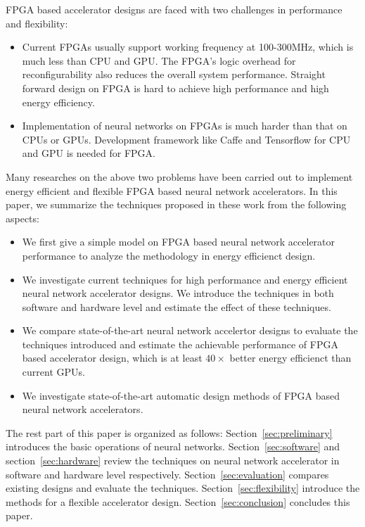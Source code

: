 FPGA based accelerator designs are faced with two challenges in performance and flexibility:
\begin{itemize}
    \item Current FPGAs usually support working frequency at 100-300MHz, which is much less than CPU and GPU. The FPGA's logic overhead for reconfigurability also reduces the overall system performance. Straight forward design on FPGA is hard to achieve high performance and high energy efficiency.
    \item Implementation of neural networks on FPGAs is much harder than that on CPUs or GPUs. Development framework like Caffe and Tensorflow for CPU and GPU is needed for FPGA.
\end{itemize}
 
Many researches on the above two problems have been carried out to implement energy efficient and flexible FPGA based neural network accelerators. In this paper, we summarize the techniques proposed in these work from the following aspects:
\begin{itemize}
    \item We first give a simple model on FPGA based neural network accelerator performance to analyze the methodology in energy efficienct design.
    \item We investigate current techniques for high performance and energy efficient neural network accelerator designs. We introduce the techniques in both software and hardware level and estimate the effect of these techniques.
    \item We compare state-of-the-art neural network accelertor designs to evaluate the techniques introduced and estimate the achievable performance of FPGA based accelerator design, which is at least $40\times$ better energy efficienct than current GPUs.
    \item We investigate state-of-the-art automatic design methods of FPGA based neural network accelerators. 
\end{itemize}

The rest part of this paper is organized as follows: Section~\ref{sec:preliminary} introduces the basic operations of neural networks. Section~\ref{sec:software} and section~\ref{sec:hardware} review the techniques on neural network accelerator in software and hardware level respectively. Section~\ref{sec:evaluation} compares existing designs and evaluate the techniques. Section~\ref{sec:flexibility} introduce the methods for a flexible accelerator design. Section~\ref{sec:conclusion} concludes this paper.